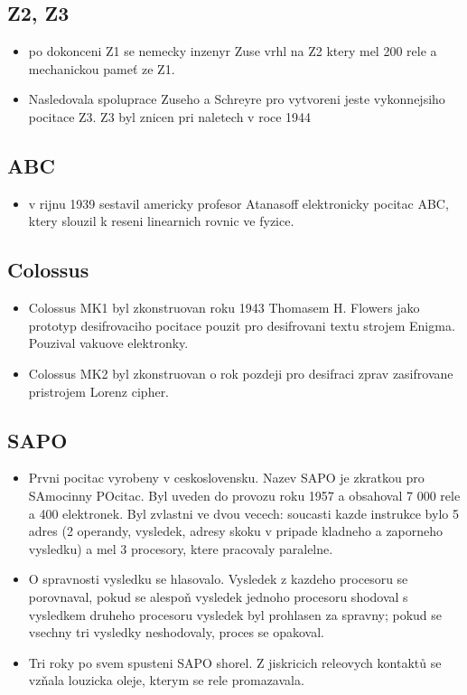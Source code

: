 \documentclass[a4paper,12pt]{article}
\begin{document}
    \subsection{Z2, Z3}
        \begin{itemize}
            \item{po dokonceni Z1 se nemecky inzenyr Zuse vrhl na Z2 ktery mel 200 rele a mechanickou pameť ze Z1.}
            \item{Nasledovala spoluprace Zuseho a Schreyre pro vytvoreni jeste vykonnejsiho pocitace Z3. Z3 byl znicen pri naletech v roce 1944}
        \end{itemize}
    \subsection{ABC}
        \begin{itemize}
            \item{v rijnu 1939 sestavil americky profesor Atanasoff elektronicky pocitac ABC, ktery slouzil k reseni linearnich rovnic ve fyzice.}
        \end{itemize}
    \subsection{Colossus}
        \begin{itemize}
            \item{Colossus MK1 byl zkonstruovan roku 1943 Thomasem H. Flowers jako prototyp desifrovaciho pocitace pouzit pro desifrovani textu strojem Enigma. Pouzival vakuove elektronky.}
            \item{Colossus MK2 byl zkonstruovan o rok pozdeji pro desifraci zprav zasifrovane pristrojem Lorenz cipher.}
        \end{itemize}
    \subsection{SAPO}
        \begin{itemize}
            \item{Prvni pocitac vyrobeny v ceskoslovensku. Nazev SAPO je zkratkou pro SAmocinny POcitac. Byl uveden do provozu roku 1957 a obsahoval 7 000 rele a 400 elektronek. Byl zvlastni ve dvou vecech: soucasti kazde instrukce bylo 5 adres (2 operandy, vysledek, adresy skoku v pripade kladneho a zaporneho vysledku) a mel 3 procesory, ktere pracovaly paralelne.}
            \item{O spravnosti vysledku se hlasovalo. Vysledek z kazdeho procesoru se porovnaval, pokud se alespoň vysledek jednoho procesoru shodoval s vysledkem druheho procesoru vysledek byl prohlasen za spravny; pokud se vsechny tri vysledky neshodovaly, proces se opakoval.}
            \item{Tri roky po svem spusteni SAPO shorel. Z jiskricich releovych kontaktů se vzňala louzicka oleje, kterym se rele promazavala.}
        \end{itemize}
\end{document}
